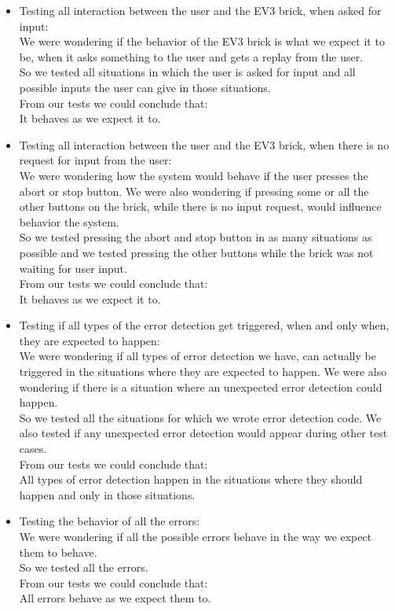 \begin{itemize}
\item Testing all interaction between the user and the EV3 brick, when asked for input:\\
We were wondering if the behavior of the EV3 brick is what we expect it to be, when it asks something to the user and gets a replay from the user.\\
So we tested all situations in which the user is asked for input and all possible inputs the user can give in those situations.\\
From our tests we could conclude that:\\
It behaves as we expect it to.\\


\item Testing all interaction between the user and the EV3 brick, when there is no request for input from the user:\\
We were wondering how the system would behave if the user presses the abort or stop button. We were also wondering if pressing some or all the other buttons on the brick, while there is no input request, would influence behavior the system.\\
So we tested pressing the abort and stop button in as many situations as possible and we tested pressing the other buttons while the brick was not waiting for user input.\\
From our tests we could conclude that:\\
It behaves as we expect it to.\\


\item Testing if all types of the error detection get triggered, when and only when, they are expected to happen:\\
We were wondering if all types of error detection we have, can actually be triggered in the situations where they are expected to happen. We were also wondering if there is a situation where an unexpected error detection could happen.\\
So we tested all the situations for which we wrote error detection code. We also tested if any unexpected error detection would appear during other test cases.\\
From our tests we could conclude that:\\
All types of error detection happen in the situations where they should happen and only in those situations.\\


\item Testing the behavior of all the errors:\\
We were wondering if all the possible errors behave in the way we expect them to behave.\\
So we tested all the errors.\\
From our tests we could conclude that:\\
All errors behave as we expect them to.\\



\end{itemize}
